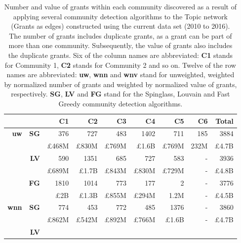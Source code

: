 \begin{table}[!htbp]
\centering
\caption[Number and value of grants within each community discovered in the Topic network (Grants as edges) constructed using the current data set (2010 to 2016)]{Number and value of grants within each community discovered as a result of applying several community detection algorithms to the Topic network (Grants as edges) constructed using the current data set (2010 to 2016). The number of grants includes duplicate grants, as a grant can be part of more than one community. Subsequently, the value of grants also includes the duplicate grants. Six of the column names are abbreviated: \textbf{C1} stands for Community 1, \textbf{C2} stands for Community 2 and so on. Twelve of the row names are abbreviated: \textbf{uw}, \textbf{wnn} and \textbf{wnv} stand for unweighted, weighted by normalized number of grants and weighted by normalized value of grants, respectively. \textbf{SG}, \textbf{LV} and \textbf{FG} stand for the Spinglass, Louvain and Fast Greedy community detection algorithms.}
\label{table:topic_a_current_grants1_appendix}
\begin{tabular}{r|r|r|r|r|r|r|r|r}
\multicolumn{2}{c|}{} & \textbf{C1} & \textbf{C2} & \textbf{C3} & \textbf{C4} & \textbf{C5} & \textbf{C6} & \textbf{Total}\\
\hline
\multirow{6}{*}{\textbf{uw}}
& \multirow{2}{*}{\textbf{SG}}
& {376} & {727} & {483} & {1402} & {711} & {185} & {3884}\\
& {} & {\pounds468M} & {\pounds830M} & {\pounds769M} & {\pounds1.6B} & {\pounds769M} & {232M} & {\pounds4.7B}\\
\cline{2-9}
& \multirow{2}{*}{\textbf{LV}}
& {590} & {1351} & {685} & {727} & {583} & {-} & {3936}\\
& {} & {\pounds689M} & {\pounds1.7B} & {\pounds843M} & {\pounds830M} & {\pounds729M} & {-} & {\pounds4.8B}\\
\cline{2-9}
& \multirow{2}{*}{\textbf{FG}}
& {1810} & {1014} & {773} & {177} & {2} & {-} & {3776}\\
& {}& {\pounds2B} & {\pounds1.3B} & {\pounds855M} & {\pounds294M} & {1.2M} & {-} & {\pounds4.5B}\\
\hline
\multirow{6}{*}{\textbf{wnn}}
& \multirow{2}{*}{\textbf{SG}}
& {774} & {453} & {772} & {485} & {1376} & {-} & {3860}\\
& {} & {\pounds862M} & {\pounds542M} & {\pounds892M} & {\pounds766M} & {\pounds1.6B} & {-} & {\pounds4.7B}\\
\cline{2-9}
& \multirow{2}{*}{\textbf{LV}}

\end{tabular}
\end{table}
